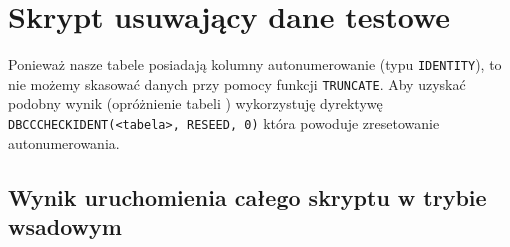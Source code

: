 \section{Skrypt usuwający dane testowe}

Ponieważ nasze tabele posiadają kolumny autonumerowanie (typu \texttt{IDENTITY}), to nie możemy skasować danych przy pomocy funkcji \texttt{TRUNCATE}. Aby uzyskać podobny wynik (opróżnienie tabeli ) wykorzystuję dyrektywę \texttt{DBCCCHECKIDENT(<tabela>, RESEED, 0)} która powoduje zresetowanie autonumerowania.



\subsection{Wynik uruchomienia całego skryptu w trybie wsadowym}

